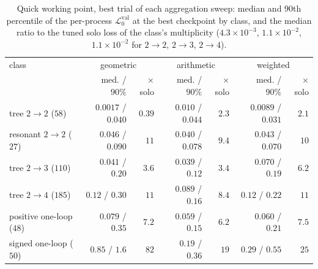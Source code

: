 \documentclass[11pt]{article}
\newcommand{\vlnr}{\mathcal{L}^{\mathrm{val}}_{0}}   %
\begin{document}
\begin{table}[H]
\centering
\caption{Quick working point, best trial of each aggregation sweep: median and $90$th
percentile of the per-process $\vlnr$ at the best checkpoint by class, and the median ratio to the
tuned solo loss of the class's multiplicity ($4.3\times10^{-3}$, $1.1\times10^{-2}$,
$1.1\times10^{-2}$ for $2\to2$, $2\to3$, $2\to4$).}
\label{tab:catv2_q_classes}
\begin{tabular}{@{}lrrrrrr@{}}
\toprule
class & \multicolumn{2}{c}{geometric} & \multicolumn{2}{c}{arithmetic} & \multicolumn{2}{c}{weighted} \\
 & med. / $90\%$ & $\times$solo & med. / $90\%$ & $\times$solo & med. / $90\%$ & $\times$solo \\
\midrule
tree $2\to2$ ($58$) & $0.0017$ / $0.040$ & $0.39$ & $0.010$ / $0.044$ & $2.3$ & $0.0089$ / $0.031$ & $2.1$ \\
resonant $2\to2$ ($27$) & $0.046$ / $0.090$ & $11$ & $0.040$ / $0.078$ & $9.4$ & $0.043$ / $0.070$ & $10$ \\
tree $2\to3$ ($110$) & $0.041$ / $0.20$ & $3.6$ & $0.039$ / $0.12$ & $3.4$ & $0.070$ / $0.19$ & $6.2$ \\
tree $2\to4$ ($185$) & $0.12$ / $0.30$ & $11$ & $0.089$ / $0.16$ & $8.4$ & $0.12$ / $0.22$ & $11$ \\
positive one-loop ($48$) & $0.079$ / $0.35$ & $7.2$ & $0.059$ / $0.15$ & $6.2$ & $0.060$ / $0.21$ & $7.5$ \\
signed one-loop ($50$) & $0.85$ / $1.6$ & $82$ & $0.19$ / $0.36$ & $19$ & $0.29$ / $0.55$ & $25$ \\
\bottomrule
\end{tabular}
\end{table}
\end{document}
